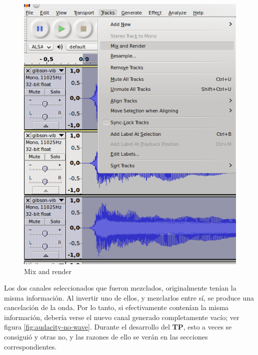 \documentclass[a4paper,spanish,12pt]{article}
\begin{document}
\begin{figure}[H]
    \centering
    \includegraphics[scale=0.70]{imagenes/audacity-mix-and-render.png}
    \caption{Mix and render}
    \label{fig:audacity-mix-and-render}
\end{figure}

Los dos canales seleccionados que fueron mezclados, originalmente tenían la misma información. Al invertir uno de ellos, y mezclarlos entre sí, se produce una cancelación de la onda. Por lo tanto, si efectivamente contenían la misma información, debería verse el nuevo canal generado completamente vacío; ver figura \ref{fig:audacity-no-wave}. Durante el desarrollo del \textbf{TP}, esto a veces se consiguió y otras no, y las razones de ello se verán en las secciones correspondientes.
\end{document}
